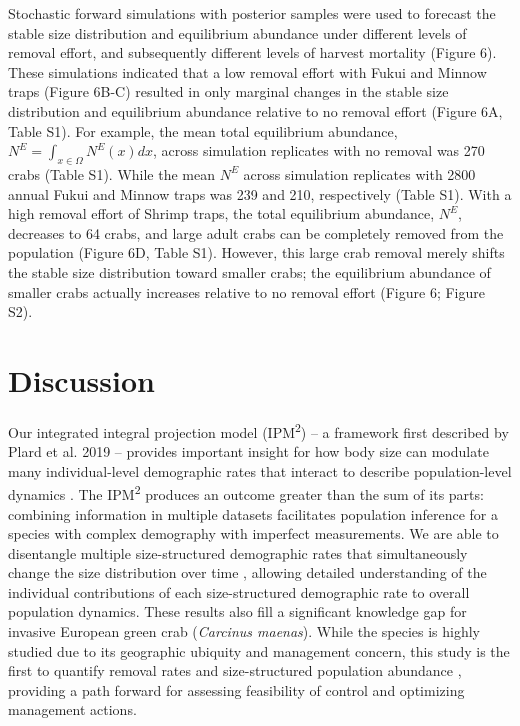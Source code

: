 \documentclass{article}
\begin{document}
Stochastic forward simulations with posterior samples were used to forecast the stable size distribution and equilibrium abundance under different levels of removal effort, and subsequently different levels of harvest mortality (Figure 6). These simulations indicated that a low removal effort with Fukui and Minnow traps (Figure 6B-C) resulted in only marginal changes in the stable size distribution and equilibrium abundance relative to no removal effort (Figure 6A, Table S1). For example, the mean total equilibrium abundance, $N^{E} = \int_{x \in \Omega}N^E(x)dx$, across simulation replicates with no removal was 270 crabs (Table S1). While the mean $N^{E}$ across simulation replicates with 2800 annual Fukui and Minnow traps was 239 and 210, respectively (Table S1). With a high removal effort of Shrimp traps, the total equilibrium abundance, $N^{E}$, decreases to 64 crabs, and large adult crabs can be completely removed from the population (Figure 6D, Table S1). However, this large crab removal merely shifts the stable size distribution toward smaller crabs; the equilibrium abundance of smaller crabs actually increases relative to no removal effort (Figure 6; Figure S2).

\section{Discussion}

Our integrated integral projection model (IPM\textsuperscript{2}) – a framework first described by Plard et al. 2019 – provides important insight for how body size can modulate many individual-level demographic rates that interact to describe population-level dynamics \parencite{plard2019ipm}. The IPM\textsuperscript{2} produces an outcome greater than the sum of its parts: combining information in multiple datasets facilitates population inference for a species with complex demography with imperfect measurements. We are able to disentangle multiple size-structured demographic rates that simultaneously change the size distribution over time \parencite{sogard1997size, carlson2010bayesian}, allowing detailed understanding of the individual contributions of each size-structured demographic rate to overall population dynamics. These results also fill a significant knowledge gap for invasive European green crab (\textit{Carcinus maenas}). While the species is highly studied due to its geographic ubiquity and management concern, this study is the first to quantify removal rates and size-structured population abundance \parencite{young2019life}, providing a path forward for assessing feasibility of control and optimizing management actions.
\end{document}
